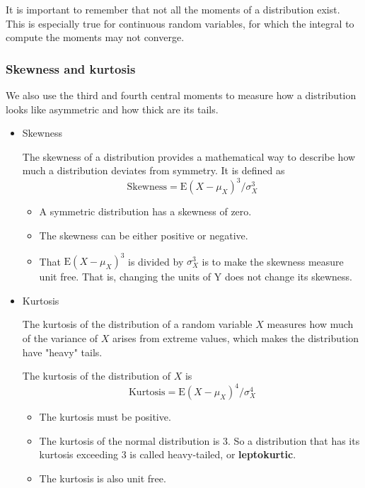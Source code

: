 \documentclass[a4paper,11pt]{article}
\begin{document}
It is important to remember that not all the moments of a distribution
exist. This is especially true for continuous random variables, for
which the integral to compute the moments may not converge.

\subsubsection*{Skewness and kurtosis}
\label{sec:org8b18b1d}

We also use the third and fourth central moments to measure how a
distribution looks like asymmetric and how thick are its tails.

\begin{itemize}
\item Skewness
\label{sec:org1403499}

The skewness of a distribution provides a mathematical way to describe
how much a distribution deviates from symmetry. It is defined as
\[ \text{Skewness} =  \mathrm{E}(X - \mu_X)^{3}/\sigma_{X}^{3} \]

\begin{itemize}
\item A symmetric distribution has a skewness of zero.
\item The skewness can be either positive or negative.
\item That \(\mathrm{E}(X - \mu_X)^3\) is divided by \(\sigma^3_X\) is to make the
skewness measure unit free. That is, changing the units of Y does
not change its skewness.
\end{itemize}

\item Kurtosis
\label{sec:org6cb87a5}

The kurtosis of the distribution of a random variable \(X\) measures how
much of the variance of \(X\) arises from extreme values, which makes
the distribution have "heavy" tails.

The kurtosis of the distribution of \(X\) is
\[ \text{Kurtosis} = \mathrm{E}(X - \mu_X)^{4}/\sigma_{X}^{4} \]

\begin{itemize}
\item The kurtosis must be positive.
\item The kurtosis of the normal distribution is 3. So a distribution that
has its kurtosis exceeding 3 is called heavy-tailed, or
\textbf{leptokurtic}.
\item The kurtosis is also unit free.
\end{itemize}


\end{itemize}
\end{document}
